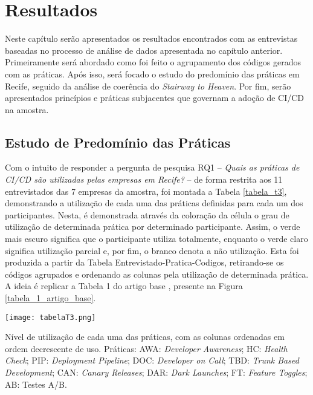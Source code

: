 \section{Resultados}

Neste capítulo serão apresentados os resultados encontrados com as entrevistas baseadas no processo de análise de dados apresentada no capítulo anterior. Primeiramente será abordado como foi feito o agrupamento dos códigos gerados com as práticas. Após isso, será focado o estudo do predomínio das práticas em Recife, seguido da análise de coerência do \emph{Stairway to Heaven}. Por fim, serão apresentados princípios e práticas subjacentes que governam a adoção de CI/CD na amostra.


\subsection{Estudo de Predomínio das Práticas}

Com o intuito de responder a pergunta de pesquisa RQ1 -- \emph{Quais as práticas de CI/CD são utilizadas pelas empresas em Recife?} -- de forma restrita aos 11 entrevistados das 7 empresas da amostra, foi montada a Tabela \ref{tabela_t3}, demonstrando a utilização de cada uma das práticas definidas para cada um dos participantes. Nesta, é demonstrada através da coloração da célula o grau de utilização de determinada prática por determinado participante. Assim, o verde mais escuro significa que o participante utiliza totalmente, enquanto o verde claro significa utilização parcial e, por fim, o branco denota a não utilização. Esta foi produzida a partir da Tabela Entrevistado-Pratica-Codigos, retirando-se os códigos agrupados e ordenando as colunas pela utilização de determinada prática. A ideia é replicar a Tabela 1 do artigo base \cite{empiricalStudy2016}, presente na Figura \ref{tabela_1_artigo_base}.

\begin{table}[ht]
\begin{center}
\texttt{[image: tabelaT3.png]}
\end{center}
\caption[Nível de utilização das práticas, com as colunas em ordem decrescente de uso]{
    Nível de utilização de cada uma das práticas, com as colunas ordenadas em ordem decrescente de uso. Práticas: AWA: \emph{Developer Awareness}; HC: \emph{Health Check}; PIP: \emph{Deployment Pipeline}; DOC: \emph{Developer on Call}; TBD: \emph{Trunk Based Development}; CAN: \emph{Canary Releases}; DAR: \emph{Dark Launches}; FT: \emph{Feature Toggles}; AB: Testes A/B.
}\label{tabela_t3}
\end{table}

